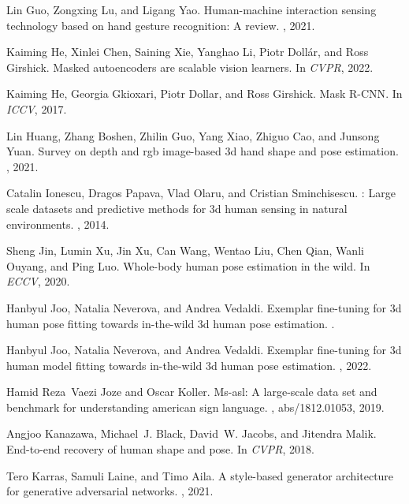 \documentclass[10pt,twocolumn,letterpaper]{article}
\begin{document}
\begin{thebibliography}{10}
Lin Guo, Zongxing Lu, and Ligang Yao.
\newblock Human-machine interaction sensing technology based on hand gesture
  recognition: A review.
, 2021.

Kaiming He, Xinlei Chen, Saining Xie, Yanghao Li, Piotr Doll{\'a}r, and Ross
  Girshick.
\newblock Masked autoencoders are scalable vision learners.
\newblock In {\em CVPR}, 2022.

Kaiming He, Georgia Gkioxari, Piotr Dollar, and Ross Girshick.
\newblock Mask {R}-{CNN}.
\newblock In {\em ICCV}, 2017.

Lin Huang, Zhang Boshen, Zhilin Guo, Yang Xiao, Zhiguo Cao, and Junsong Yuan.
\newblock Survey on depth and rgb image-based 3d hand shape and pose
  estimation.
, 2021.

Catalin Ionescu, Dragos Papava, Vlad Olaru, and Cristian Sminchisescu.
: Large scale datasets and predictive methods for 3d human
  sensing in natural environments.
, 2014.

Sheng Jin, Lumin Xu, Jin Xu, Can Wang, Wentao Liu, Chen Qian, Wanli Ouyang, and
  Ping Luo.
\newblock Whole-body human pose estimation in the wild.
\newblock In {\em ECCV}, 2020.

Hanbyul Joo, Natalia Neverova, and Andrea Vedaldi.
\newblock Exemplar fine-tuning for 3d human pose fitting towards in-the-wild 3d
  human pose estimation.
.

Hanbyul Joo, Natalia Neverova, and Andrea Vedaldi.
\newblock Exemplar fine-tuning for 3d human model fitting towards in-the-wild
  3d human pose estimation.
, 2022.

Hamid Reza~Vaezi Joze and Oscar Koller.
\newblock Ms-asl: A large-scale data set and benchmark for understanding
  american sign language.
, abs/1812.01053, 2019.

Angjoo Kanazawa, Michael~J. Black, David~W. Jacobs, and Jitendra Malik.
\newblock End-to-end recovery of human shape and pose.
\newblock In {\em CVPR}, 2018.

Tero Karras, Samuli Laine, and Timo Aila.
\newblock A style-based generator architecture for generative adversarial
  networks.
, 2021.


\end{thebibliography}
\end{document}
